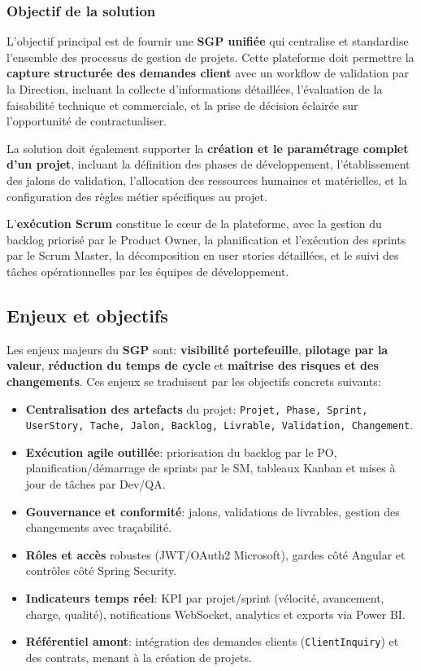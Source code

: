 \subsubsection{Objectif de la solution}

L'objectif principal est de fournir une \textbf{SGP unifiée} qui centralise et standardise l'ensemble des processus de gestion de projets. Cette plateforme doit permettre la \textbf{capture structurée des demandes client} avec un workflow de validation par la Direction, incluant la collecte d'informations détaillées, l'évaluation de la faisabilité technique et commerciale, et la prise de décision éclairée sur l'opportunité de contractualiser.

La solution doit également supporter la \textbf{création et le paramétrage complet d'un projet}, incluant la définition des phases de développement, l'établissement des jalons de validation, l'allocation des ressources humaines et matérielles, et la configuration des règles métier spécifiques au projet.

L'\textbf{exécution Scrum} constitue le cœur de la plateforme, avec la gestion du backlog priorisé par le Product Owner, la planification et l'exécution des sprints par le Scrum Master, la décomposition en user stories détaillées, et le suivi des tâches opérationnelles par les équipes de développement.

\subsection{Enjeux et objectifs}

Les enjeux majeurs du \textbf{SGP} sont: \textbf{visibilité portefeuille}, \textbf{pilotage par la valeur}, \textbf{réduction du temps de cycle} et \textbf{maîtrise des risques et des changements}. Ces enjeux se traduisent par les objectifs concrets suivants:

\begin{itemize}
    \item \textbf{Centralisation des artefacts} du projet: \texttt{Projet, Phase, Sprint, UserStory, Tache, Jalon, Backlog, Livrable, Validation, Changement}.
    \item \textbf{Exécution agile outillée}: priorisation du backlog par le PO, planification/démarrage de sprints par le SM, tableaux Kanban et mises à jour de tâches par Dev/QA.
    \item \textbf{Gouvernance et conformité}: jalons, validations de livrables, gestion des changements avec traçabilité.
    \item \textbf{Rôles et accès} robustes (JWT/OAuth2 Microsoft), gardes côté Angular et contrôles côté Spring Security.
    \item \textbf{Indicateurs temps réel}: KPI par projet/sprint (vélocité, avancement, charge, qualité), notifications WebSocket, analytics et exports via Power BI.
    \item \textbf{Référentiel amont}: intégration des demandes clients (\texttt{ClientInquiry}) et des contrats, menant à la création de projets.
\end{itemize}

